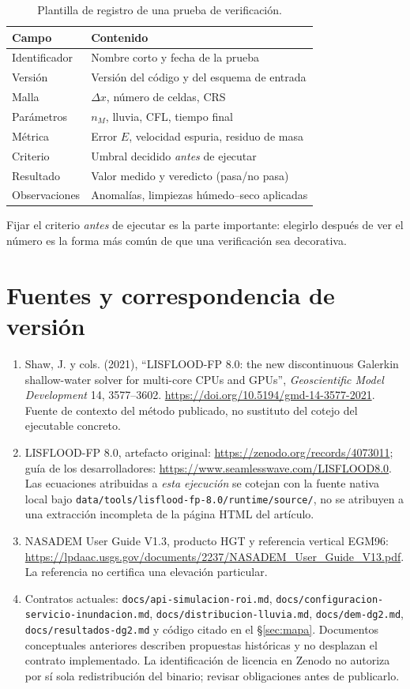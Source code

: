 \documentclass[11pt,a4paper]{article}
\newcommand{\src}[1]{\nolinkurl{#1}}
\begin{document}
\begin{table}[htbp]
\centering
\caption{Plantilla de registro de una prueba de verificación.}
\label{tab:registro}
\small
\begin{tabularx}{\linewidth}{@{}lX@{}}
\toprule
Campo & Contenido \\
\midrule
Identificador & Nombre corto y fecha de la prueba \\
Versión & Versión del código y del esquema de entrada \\
Malla & $\Delta x$, número de celdas, CRS \\
Parámetros & $n_M$, lluvia, CFL, tiempo final \\
Métrica & Error $E$, velocidad espuria, residuo de masa \\
Criterio & Umbral decidido \emph{antes} de ejecutar \\
Resultado & Valor medido y veredicto (pasa/no pasa) \\
Observaciones & Anomalías, limpiezas húmedo--seco aplicadas \\
\bottomrule
\end{tabularx}
\end{table}

Fijar el criterio \emph{antes} de ejecutar es la parte importante: elegirlo después de ver el número es la forma
más común de que una verificación sea decorativa.


\section{Fuentes y correspondencia de versión}
\begin{enumerate}
\item Shaw, J. y cols. (2021), ``LISFLOOD-FP 8.0: the new discontinuous Galerkin shallow-water solver for multi-core CPUs and GPUs'', \emph{Geoscientific Model Development} 14, 3577--3602. \url{https://doi.org/10.5194/gmd-14-3577-2021}. Fuente de contexto del método publicado, no sustituto del cotejo del ejecutable concreto.
\item LISFLOOD-FP 8.0, artefacto original: \url{https://zenodo.org/records/4073011}; guía de los desarrolladores: \url{https://www.seamlesswave.com/LISFLOOD8.0}. Las ecuaciones atribuidas a \emph{esta ejecución} se cotejan con la fuente nativa local bajo \src{data/tools/lisflood-fp-8.0/runtime/source/}, no se atribuyen a una extracción incompleta de la página HTML del artículo.
\item NASADEM User Guide V1.3, producto HGT y referencia vertical EGM96: \url{https://lpdaac.usgs.gov/documents/2237/NASADEM_User_Guide_V13.pdf}. La referencia no certifica una elevación particular.
\item Contratos actuales: \src{docs/api-simulacion-roi.md}, \src{docs/configuracion-servicio-inundacion.md}, \src{docs/distribucion-lluvia.md}, \src{docs/dem-dg2.md}, \src{docs/resultados-dg2.md} y código citado en el \S\ref{sec:mapa}. Documentos conceptuales anteriores describen propuestas históricas y no desplazan el contrato implementado. La identificación de licencia en Zenodo no autoriza por sí sola redistribución del binario; revisar obligaciones antes de publicarlo.
\end{enumerate}
\end{document}
